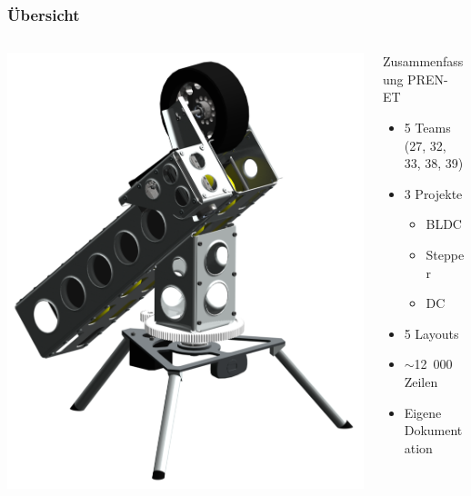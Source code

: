 \begin{frame}
    \frametitle{Übersicht}
    \begin{columns}
        \begin{column}{0.50\textwidth}
            \centering
            \includegraphics[width=1.00\textwidth]{../doc/fig/Bild_mit_Kamera.png}
        \end{column}
        \begin{column}{0.50\textwidth}
            \begin{block}{Zusammenfassung PREN-ET}
                \begin{itemize}
                    \item 5 Teams (27, 32, 33, 38, 39)
                    \item 3 Projekte
                    \begin{itemize}
                        \item BLDC
                        \item Stepper
                        \item DC
                    \end{itemize}
                    \item 5 Layouts
                    \item $\sim$12~000 Zeilen %
                    \item Eigene Dokumentation
                \end{itemize}
            \end{block}
        \end{column}
    \end{columns}
\end{frame}
